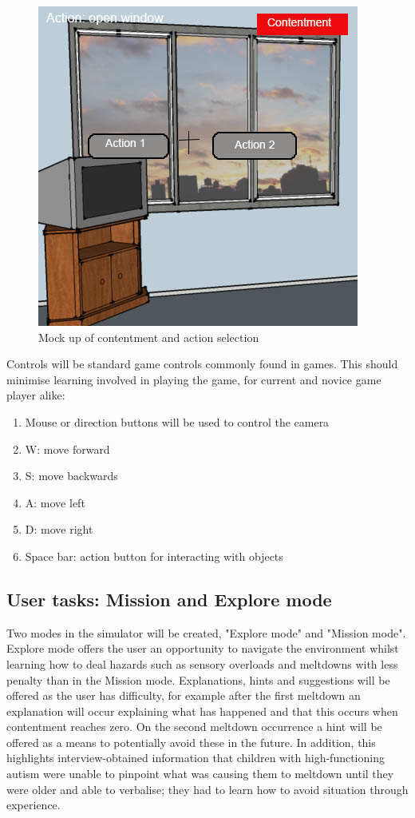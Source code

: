 \begin{figure}[H]
\centering
\includegraphics[scale=0.5]{images/design/interface_actions.jpg}
\caption{Mock up of contentment and action selection}
\label{design_interface_actions}
\end{figure}

Controls will be standard game controls commonly found in games. This should minimise learning involved in playing the game,  for current and novice game player alike: 

\begin{enumerate}
\item Mouse or direction buttons will be used to control the camera
\item W: move forward
\item S: move backwards
\item A: move left
\item D: move right
\item Space bar: action button for interacting with objects
\end{enumerate}

\subsection{User tasks: Mission and Explore mode}
Two modes in the simulator will be created, "Explore mode" and "Mission mode". Explore mode offers the user an opportunity to navigate the environment whilst learning how to deal hazards such as sensory overloads and meltdowns with less penalty than in the Mission mode. Explanations, hints and suggestions will be offered as the user has difficulty, for example after the first meltdown an explanation will occur explaining what has happened and that this occurs when contentment reaches zero. On the second meltdown occurrence a hint will be offered as a means to potentially avoid these in the future. In addition, this highlights interview-obtained information that children with high-functioning autism were unable to pinpoint what was causing them to meltdown until they were older and able to verbalise; they had to learn how to avoid situation through experience. 

